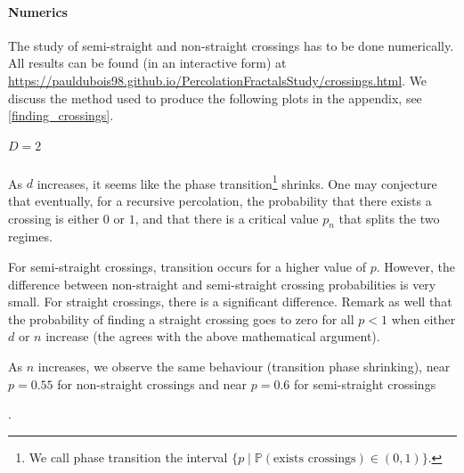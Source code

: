 \paragraph{Numerics}
The study of semi-straight and non-straight crossings has to be done numerically.
All results can be found (in an interactive form) at \url{https://pauldubois98.github.io/PercolationFractalsStudy/crossings.html}.
We discuss the method used to produce the following plots in the appendix, see \ref{finding_crossings}.

\subparagraph{$D=2$}
As $d$ increases, it seems like the phase transition\footnote{We call phase transition the interval $\{ p \mid \mathbb{P}(\text{exists crossings}) \in (0,1) \}$.} shrinks.
One may conjecture that eventually, for a recursive percolation, the probability that there exists a crossing is either $0$ or $1$, and that there is a critical value $p_n$ that splits the two regimes.

For semi-straight crossings, transition occurs for a higher value of $p$\footnotemark.
However, the difference between non-straight and semi-straight crossing probabilities is very small.
For straight crossings, there is a significant difference.
Remark as well that the probability of finding a straight crossing goes to zero for all $p<1$ when either $d$ or $n$ increase (the agrees with the above mathematical argument).

As $n$ increases, we observe the same behaviour (transition phase shrinking), near $p=0.55$ for non-straight crossings and near $p=0.6$ for semi-straight crossings\addtocounter{footnote}{-1}\footnotemark.

